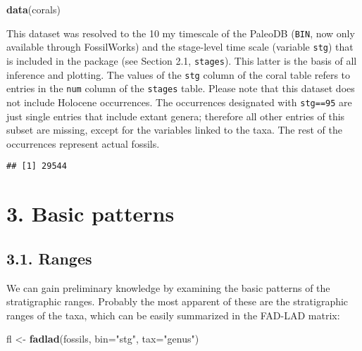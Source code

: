 \documentclass[]{article}
\newenvironment{Shaded}{\begin{snugshade}}{\end{snugshade}}
\newcommand{\KeywordTok}[1]{\textcolor[rgb]{0.13,0.29,0.53}{\textbf{{#1}}}}
\newcommand{\DataTypeTok}[1]{\textcolor[rgb]{0.13,0.29,0.53}{{#1}}}
\newcommand{\DecValTok}[1]{\textcolor[rgb]{0.00,0.00,0.81}{{#1}}}
\newcommand{\StringTok}[1]{\textcolor[rgb]{0.31,0.60,0.02}{{#1}}}
\newcommand{\CommentTok}[1]{\textcolor[rgb]{0.56,0.35,0.01}{\textit{{#1}}}}
\newcommand{\NormalTok}[1]{{#1}}
\begin{document}
\begin{Shaded}
\begin{Highlighting}[]
\KeywordTok{data}\NormalTok{(corals)}
\end{Highlighting}
\end{Shaded}

This dataset was resolved to the 10 my timescale of the PaleoDB
(\texttt{BIN}, now only available through FossilWorks) and the
stage-level time scale (variable \texttt{stg}) that is included in the
package (see Section 2.1, \texttt{stages}). This latter is the basis of
all inference and plotting. The values of the \texttt{stg} column of the
coral table refers to entries in the \texttt{num} column of the
\texttt{stages} table. Please note that this dataset does not include
Holocene occurrences. The occurrences designated with \texttt{stg==95}
are just single entries that include extant genera; therefore all other
entries of this subset are missing, except for the variables linked to
the taxa. The rest of the occurrences represent actual fossils.

\begin{Shaded}
\end{Shaded}

\begin{verbatim}
## [1] 29544
\end{verbatim}

\section{3. Basic patterns}\label{basic-patterns}

\subsection{3.1. Ranges}\label{ranges}

We can gain preliminary knowledge by examining the basic patterns of the
stratigraphic ranges. Probably the most apparent of these are the
stratigraphic ranges of the taxa, which can be easily summarized in the
FAD-LAD matrix:

\begin{Shaded}
\begin{Highlighting}[]
\NormalTok{fl <-}\StringTok{ }\KeywordTok{fadlad}\NormalTok{(fossils, }\DataTypeTok{bin=}\StringTok{"stg"}\NormalTok{, }\DataTypeTok{tax=}\StringTok{"genus"}\NormalTok{)}
\end{Highlighting}
\end{Shaded}
\end{document}
